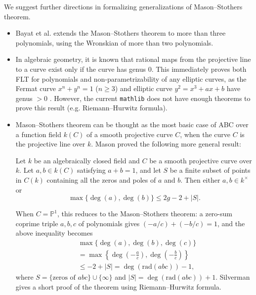 \documentclass[runningheads]{llncs}
\newcommand{\rad}{\mathrm{rad}}
\begin{document}
We suggest further directions in formalizing generalizations of Mason--Stothers theorem.
\begin{itemize}[label=\textbullet]
    \item Bayat et al. \cite{bayat05} extends the Mason--Stothers theorem to more than three polynomials, using the Wronskian of more than two polynomials.

    \item In algebraic geometry, it is known that rational maps from the projective line to a curve exist only if the curve has genus 0. This immediately proves both FLT for polynomials and non-parametrizability of any elliptic curves, as the Fermat curve $x^n + y^n = 1$ ($n\geq 3$) and elliptic curve $y^2 = x^3 + ax + b$ have genus $> 0$ \cite{franz}.
    However, the current \texttt{mathlib} does not have enough theorems to prove this result (e.g. Riemann--Hurwitz formula).
        
    \item Mason--Stothers theorem can be thought as the most basic case of ABC over a function field $k(C)$ of a smooth projective curve $C$, when the curve $C$ is the projective line over $k$.
    Mason \cite{mason83} proved the following more general result:
    \begin{theorem}[Mason]
    Let $k$ be an algebraically closed field and $C$ be a smooth projective curve over $k$.
    Let $a, b \in k(C)$ satisfying $a + b = 1$, and let $S$ be a finite subset of points in $C(k)$ containing all the zeros and poles of $a$ and $b$.
    Then either $a, b \in k^\times$ or 
    \[
         \max\{\deg(a), \deg(b)\} \leq 2g - 2 + |S|.
    \]
    \end{theorem}
    When $C = \mathbb{P}^1$, this reduces to the Mason--Stothers theorem:
    a zero-sum coprime triple $a, b, c$ of polynomials gives $(-a/c) + (-b/c) = 1$, and the above inequality becomes
    \begin{align*}
        &\max \{ \deg(a), \deg(b), \deg(c) \} \\
        &= \max \left\{\deg \left(-\frac{a}{c}\right), \deg \left( - \frac{b}{c}\right) \right\} \\
        &\leq -2 + |S| = \deg (\rad(abc)) - 1,
    \end{align*}
    where $S = \{\text{zeros of }abc\} \cup \{\infty\}$ and $|S| = \deg (\rad(abc)) + 1$.
    Silverman \cite{silverman84} gives a short proof of the theorem using Riemann--Hurwitz formula.

\end{itemize}
\end{document}
